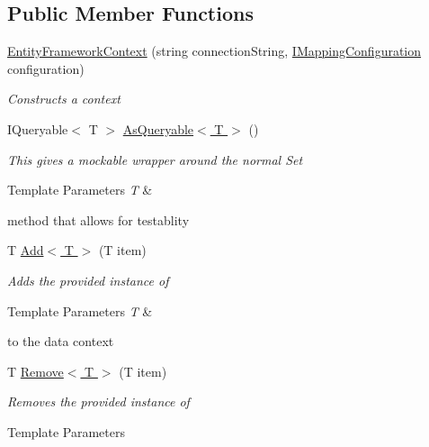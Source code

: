 \subsection*{Public Member Functions}
\begin{DoxyCompactItemize}
\item 
\hyperlink{class_highway_1_1_data_1_1_entity_framework_1_1_contexts_1_1_entity_framework_context_af9731a0bf0b89baabddd5d1ea3d78912}{Entity\-Framework\-Context} (string connection\-String, \hyperlink{interface_highway_1_1_data_1_1_entity_framework_1_1_mappings_1_1_i_mapping_configuration}{I\-Mapping\-Configuration} configuration)
\begin{DoxyCompactList}\small\item\em Constructs a context \end{DoxyCompactList}\item 
I\-Queryable$<$ T $>$ \hyperlink{class_highway_1_1_data_1_1_entity_framework_1_1_contexts_1_1_entity_framework_context_a4af775d2ca582477cfc53daa5903fab5}{As\-Queryable$<$ T $>$} ()
\begin{DoxyCompactList}\small\item\em This gives a mockable wrapper around the normal Set
\begin{DoxyTemplParams}{Template Parameters}
{\em T} & \\
\hline
\end{DoxyTemplParams}
method that allows for testablity \end{DoxyCompactList}\item 
T \hyperlink{class_highway_1_1_data_1_1_entity_framework_1_1_contexts_1_1_entity_framework_context_a8d50357ea11414364e9155ef79048b21}{Add$<$ T $>$} (T item)
\begin{DoxyCompactList}\small\item\em Adds the provided instance of 
\begin{DoxyTemplParams}{Template Parameters}
{\em T} & \\
\hline
\end{DoxyTemplParams}
to the data context \end{DoxyCompactList}\item 
T \hyperlink{class_highway_1_1_data_1_1_entity_framework_1_1_contexts_1_1_entity_framework_context_a36b80fcc6db41fd1036bbc4ea466294b}{Remove$<$ T $>$} (T item)
\begin{DoxyCompactList}\small\item\em Removes the provided instance of 
\begin{DoxyTemplParams}{Template Parameters}

\end{DoxyTemplParams}
\end{DoxyCompactList}
\end{DoxyCompactItemize}
